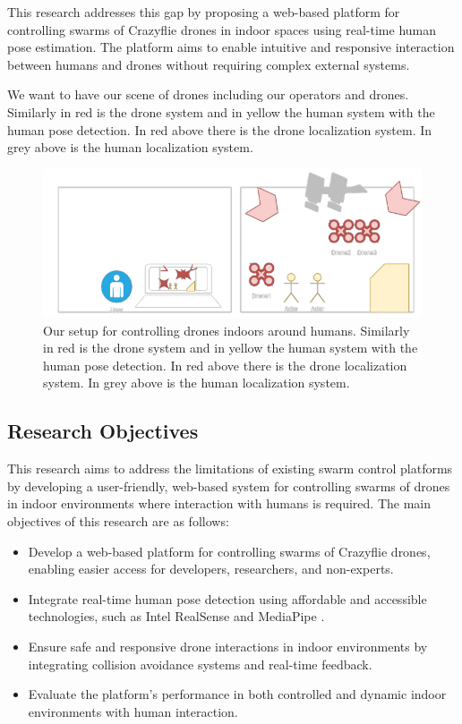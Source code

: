 This research addresses this gap by proposing a web-based platform for controlling swarms of Crazyflie drones in indoor spaces using real-time human pose estimation. The platform aims to enable intuitive and responsive interaction between humans and drones without requiring complex external systems.

We want to have our scene of drones including our operators and drones. Similarly in red is the drone system and in yellow the human system with the human pose detection. In red above there is the drone localization system. In grey above is the human localization system.

\begin{figure}[htbp]
    \centerline{\includegraphics{images/setting.png}}
    \caption{ Our setup for controlling drones indoors around humans. Similarly in red is the drone system and in yellow the human system with the human pose detection. In red above there is the drone localization system. In grey above is the human localization system. }
    \label{fig}
    \end{figure}

\subsection{Research Objectives}

This research aims to address the limitations of existing swarm control platforms by developing a user-friendly, web-based system for controlling swarms of drones in indoor environments where interaction with humans is required. The main objectives of this research are as follows:

\begin{itemize}
    \item Develop a web-based platform for controlling swarms of Crazyflie drones, enabling easier access for developers, researchers, and non-experts.
    \item Integrate real-time human pose detection using affordable and accessible technologies, such as Intel RealSense and MediaPipe \cite{realsense_mediapipe}.
    \item Ensure safe and responsive drone interactions in indoor environments by integrating collision avoidance systems and real-time feedback.
    \item Evaluate the platform's performance in both controlled and dynamic indoor environments with human interaction.
\end{itemize}

